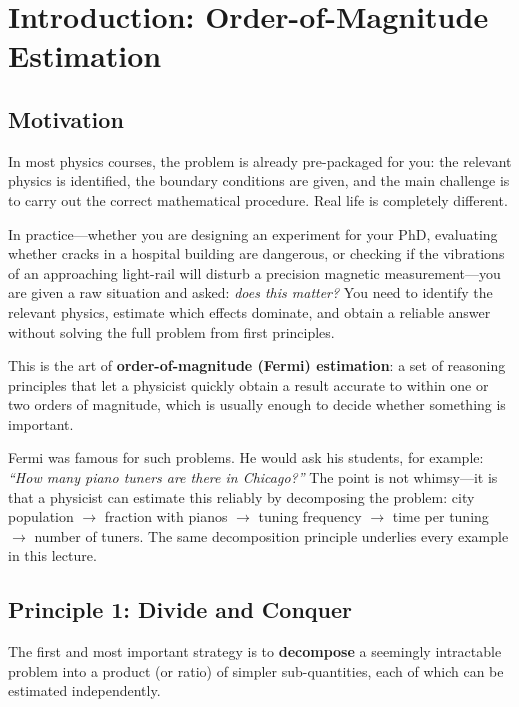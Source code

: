 \section{Introduction: Order-of-Magnitude Estimation}

\subsection{Motivation}

In most physics courses, the problem is already pre-packaged for you: the relevant physics is identified, the boundary conditions are given, and the main challenge is to carry out the correct mathematical procedure. Real life is completely different.

In practice---whether you are designing an experiment for your PhD, evaluating whether cracks in a hospital building are dangerous, or checking if the vibrations of an approaching light-rail will disturb a precision magnetic measurement---you are given a raw situation and asked: \emph{does this matter?} You need to identify the relevant physics, estimate which effects dominate, and obtain a reliable answer without solving the full problem from first principles.

This is the art of \textbf{order-of-magnitude (Fermi) estimation}: a set of reasoning principles that let a physicist quickly obtain a result accurate to within one or two orders of magnitude, which is usually enough to decide whether something is important.

\begin{remark}
  Fermi was famous for such problems. He would ask his students, for example: \emph{``How many piano tuners are there in Chicago?''} The point is not whimsy---it is that a physicist can estimate this reliably by decomposing the problem: city population $\to$ fraction with pianos $\to$ tuning frequency $\to$ time per tuning $\to$ number of tuners. The same decomposition principle underlies every example in this lecture.
\end{remark}

\subsection{Principle 1: Divide and Conquer}

The first and most important strategy is to \textbf{decompose} a seemingly intractable problem into a product (or ratio) of simpler sub-quantities, each of which can be estimated independently.

